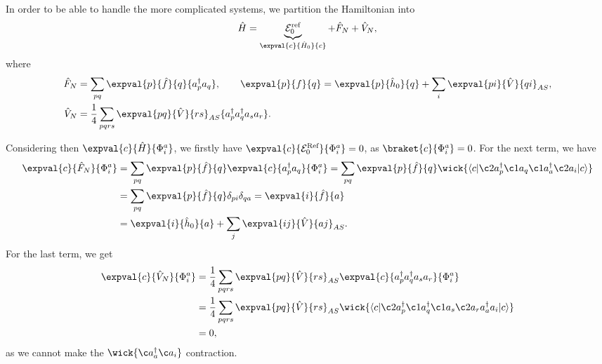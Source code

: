 In order to be able to handle the more complicated systems, we partition the Hamiltonian into
\begin{equation}
    \hat{H} = \underbrace{\mathcal{E}_0^{\text{ref}}}_{\expval{c}{\hat{H}_0}{c}} + \hat{F}_N + \hat{V}_N,
\end{equation}
where
\begin{align*}
    \hat{F}_N &= \sum_{pq} \expval{p}{\hat{f}}{q} \{a_p^\dagger a_q\}, \qquad
    \expval{p}{f}{q} = \expval{p}{\hat{h}_0}{q} + \sum_{i} \expval{pi}{\hat{V}}{qi}_{AS}, \\
    \hat{V}_N &= \frac{1}{4} \sum_{pqrs} \expval{pq}{\hat{V}}{rs}_{AS} \{a_p^\dagger a_q^\dagger a_s a_r\}.
\end{align*}

Considering then $\expval{c}{\hat{H}}{\Phi_i^a}$, we firstly have $\expval{c}{\mathcal{E}_0^{\text{Ref}}}{\Phi_i^a} = 0$, as $\braket{c}{\Phi_i^a} = 0$.
For the next term, we have
\begin{align*}
    \expval{c}{\hat{F}_N}{\Phi_i^a} &= \sum_{pq} \expval{p}{\hat{f}}{q} \expval{c}{a_p^\dagger a_q}{\Phi_i^a}
    = \sum_{pq} \expval{p}{\hat{f}}{q} \wick{
        \langle c \vert
        \c2 a_p^\dagger \c1 a_q \c1 a_a^\dagger \c2 a_i
        \vert c \rangle
    } \\
    &= \sum_{pq} \expval{p}{\hat{f}}{q} \delta_{pi} \delta_{qa}
    = \expval{i}{\hat{f}}{a} \\
    &= \expval{i}{\hat{h}_0}{a} + \sum_{j} \expval{ij}{\hat{V}}{aj}_{AS}.
\end{align*}
For the last term, we get
\begin{align*}
    \expval{c}{\hat{V}_N}{\Phi_i^a} &= \frac{1}{4} \sum_{pqrs} \expval{pq}{\hat{V}}{rs}_{AS} \expval{c}{a_p^\dagger a_q^\dagger a_s a_r}{\Phi_i^a} \\
    &= \frac{1}{4} \sum_{pqrs} \expval{pq}{\hat{V}}{rs}_{AS} \wick{
        \langle c \vert
        \c2 a_p^\dagger \c1 a_q^\dagger \c1 a_s \c2 a_r a_a^\dagger a_i
        \vert c \rangle
    } \\
    &= 0,
\end{align*}
as we cannot make the $\wick{\c a_a^\dagger \c a_i}$ contraction.
